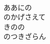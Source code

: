 \documentclass[10pt,b5j]{tarticle} %
\begin{document}
\begin{enumerate}
\begin{minipage}[c]{\blocksize}
        \vspace{\linespace}
        \item~\\
        ああにの\\
        のかげさえて\\
        きのの\\
        のつきざらん
    
    \end{minipage}
\end{enumerate} %
\end{document}
